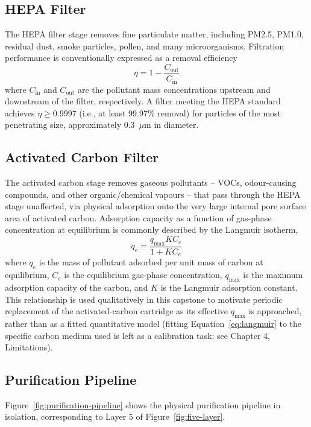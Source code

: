 \subsection{HEPA Filter}
The HEPA filter stage removes fine particulate matter, including PM2.5, PM1.0, residual dust, smoke particles, pollen, and many microorganisms. Filtration performance is conventionally expressed as a removal efficiency
\begin{equation}
\eta = 1 - \frac{C_{\text{out}}}{C_{\text{in}}}
\label{eq:hepa-efficiency}
\end{equation}
where $C_{\text{in}}$ and $C_{\text{out}}$ are the pollutant mass concentrations upstream and downstream of the filter, respectively. A filter meeting the HEPA standard achieves $\eta \geq 0.9997$ (i.e., at least 99.97\% removal) for particles of the most penetrating size, approximately 0.3~$\mu$m in diameter.

\subsection{Activated Carbon Filter}
The activated carbon stage removes gaseous pollutants -- VOCs, odour-causing compounds, and other organic/chemical vapours -- that pass through the HEPA stage unaffected, via physical adsorption onto the very large internal pore surface area of activated carbon. Adsorption capacity as a function of gas-phase concentration at equilibrium is commonly described by the Langmuir isotherm,
\begin{equation}
q_e = \frac{q_{\max} K C_e}{1 + K C_e}
\label{eq:langmuir}
\end{equation}
where $q_e$ is the mass of pollutant adsorbed per unit mass of carbon at equilibrium, $C_e$ is the equilibrium gas-phase concentration, $q_{\max}$ is the maximum adsorption capacity of the carbon, and $K$ is the Langmuir adsorption constant. This relationship is used qualitatively in this capstone to motivate periodic replacement of the activated-carbon cartridge as its effective $q_{\max}$ is approached, rather than as a fitted quantitative model (fitting Equation~\ref{eq:langmuir} to the specific carbon medium used is left as a calibration task; see Chapter 4, Limitations).

\subsection{Purification Pipeline}
Figure~\ref{fig:purification-pipeline} shows the physical purification pipeline in isolation, corresponding to Layer 5 of Figure~\ref{fig:five-layer}.

